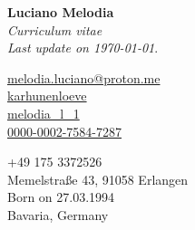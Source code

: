 \documentclass[a4paper,11pt]{article}
\begin{document}
{
    {
        \Huge \textbf{Luciano Melodia}}\\[0.1cm]
    \emph{Curriculum vitae}\\
    \emph{Last update on \today}.
    
    \begin{flushleft}
        \scriptsize
        \begin{minipage}{0.3\textwidth}
            {\footnotesize \faEnvelope} \hspace{0.1cm} \href{mailto:melodia.luciano@proton.me}{melodia.luciano@proton.me}\\[0.05cm]
            {\footnotesize \faGithub} \hspace{0.15cm} \href{https://github.com/karhunenloeve}{karhunenloeve}\\[0.05cm]
            {\footnotesize \aiarXiv} \hspace{0.1cm} \href{https://arxiv.org/a/melodia_l_1}{melodia\_l\_1}\\[0.05cm]
            {\footnotesize \aiOrcid} \hspace{0.1cm} \href{https://orcid.org/0000-0002-7584-7287}{0000-0002-7584-7287}
        \end{minipage}
        \begin{minipage}{0.4\textwidth}
            {\footnotesize \faPhone} \hspace{0.15cm} +49 175 3372526 \\[0.05cm]
            {\footnotesize \faMapPin} \hspace{0.23cm} Memelstraße 43, 91058 Erlangen\\[0.05cm]
            {\footnotesize \faMars} \hspace{0.1cm} Born on 27.03.1994\\[0.05cm]
            {\footnotesize \faMapO} \hspace{0.1cm} Bavaria, Germany
        \end{minipage}
    \end{flushleft}
}

\end{document}
